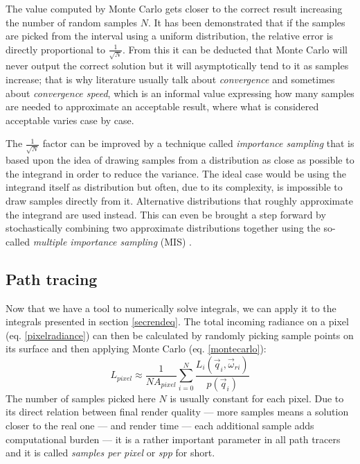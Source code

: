 The value computed by Monte Carlo gets closer to the correct result increasing the number of random samples $N$. It has been demonstrated that if the samples are picked from the interval using a uniform distribution, the relative error is directly proportional to $\frac{1}{\sqrt{N}}$. From this it can be deducted that Monte Carlo will never output the correct solution but it will asymptotically tend to it as samples increase; that is why literature usually talk about \textit{convergence} and sometimes about \textit{convergence speed}, which is an informal value expressing how many samples are needed to approximate an acceptable result, where what is considered acceptable varies case by case.

The $\frac{1}{\sqrt{N}}$ factor can be improved by a technique called \textit{importance sampling} that is based upon the idea of drawing samples from a distribution as close as possible to the integrand in order to reduce the variance. The ideal case would be using the integrand itself as distribution but often, due to its complexity, is impossible to draw samples directly from it. Alternative distributions that roughly approximate the integrand are used instead.
This can even be brought a step forward by stochastically combining two approximate distributions together using the so-called \textit{multiple importance sampling} (MIS) \cite{veach1995optimally}.

\subsection{Path tracing}

Now that we have a tool to numerically solve integrals, we can apply it to the integrals presented in section \ref{secrendeq}. The total incoming radiance on a pixel (eq. \ref{pixelradiance}) can then be calculated by randomly picking sample points on its surface and then applying Monte Carlo (eq. \ref{montecarlo}):
\begin{equation}
	L_{pixel} \approx \frac{1}{N A_{pixel}} 
		\sum^{N}_{i = 0} \frac{L_i(\vec{q}_i, \vec{\omega}_{ri})}{p(\vec{q}_i)}
\end{equation}
The number of samples picked here $N$ is usually constant for each pixel. Due to its direct relation between final render quality --- more samples means a solution closer to the real one --- and render time --- each additional sample adds computational burden --- it is a rather important parameter in all path tracers and it is called \textit{samples per pixel} or \textit{spp} for short.

